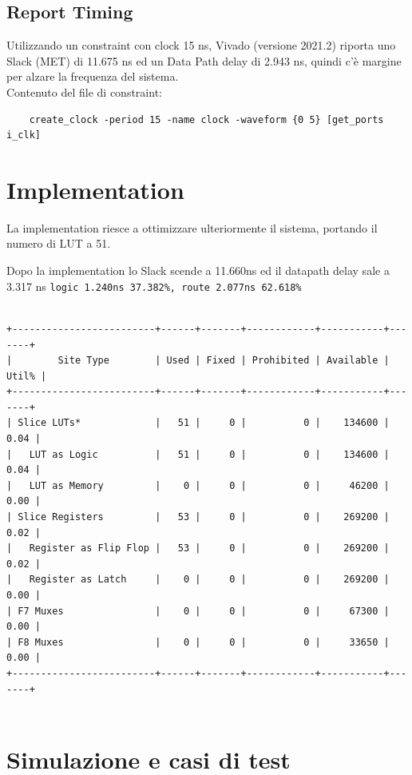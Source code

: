 \documentclass[12pt, a4paper]{article}
\begin{document}
\subsection{Report Timing}

Utilizzando un constraint con clock 15 ns, Vivado (versione 2021.2) riporta
uno Slack (MET) di 11.675 ns ed un Data Path delay di 2.943 ns, quindi c'è margine per
alzare la frequenza del sistema.
\\

\noindent Contenuto del file di constraint:
\begin{verbatim}
    create_clock -period 15 -name clock -waveform {0 5} [get_ports i_clk]
\end{verbatim}

\pagebreak

\section{Implementation}

La implementation riesce a ottimizzare ulteriormente il sistema, portando il numero di LUT a 51.

\noindent Dopo la implementation lo Slack scende a 11.660ns ed il datapath delay sale a 3.317 ns \texttt{logic 1.240ns 37.382\%, route 2.077ns 62.618\%}

\begin{verbatim}

+-------------------------+------+-------+------------+-----------+-------+
|        Site Type        | Used | Fixed | Prohibited | Available | Util% |
+-------------------------+------+-------+------------+-----------+-------+
| Slice LUTs*             |   51 |     0 |          0 |    134600 |  0.04 |
|   LUT as Logic          |   51 |     0 |          0 |    134600 |  0.04 |
|   LUT as Memory         |    0 |     0 |          0 |     46200 |  0.00 |
| Slice Registers         |   53 |     0 |          0 |    269200 |  0.02 |
|   Register as Flip Flop |   53 |     0 |          0 |    269200 |  0.02 |
|   Register as Latch     |    0 |     0 |          0 |    269200 |  0.00 |
| F7 Muxes                |    0 |     0 |          0 |     67300 |  0.00 |
| F8 Muxes                |    0 |     0 |          0 |     33650 |  0.00 |
+-------------------------+------+-------+------------+-----------+-------+
    
    \end{verbatim}

\section{Simulazione e casi di test}
\end{document}
